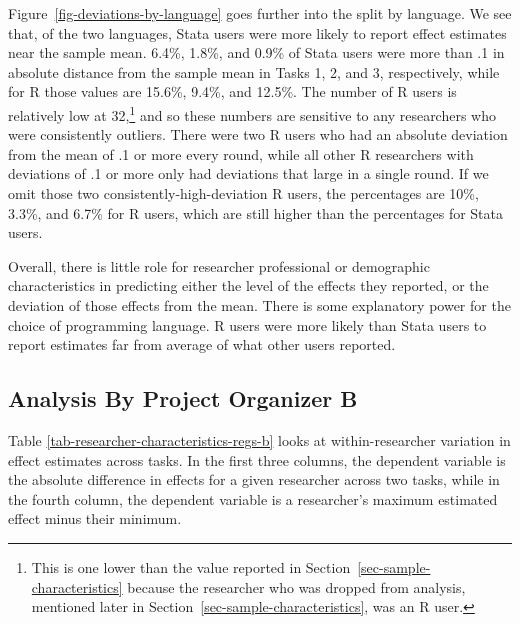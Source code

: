 \documentclass[
  letterpaper,
  DIV=11,
  numbers=noendperiod]{scrartcl}
\begin{document}
Figure~\ref{fig-deviations-by-language} goes further into the split by
language. We see that, of the two languages, Stata users were more
likely to report effect estimates near the sample mean. 6.4\%, 1.8\%,
and 0.9\% of Stata users were more than .1 in absolute distance from the
sample mean in Tasks 1, 2, and 3, respectively, while for R those values
are 15.6\%, 9.4\%, and 12.5\%. The number of R users is relatively low
at 32,\footnote{This is one lower than the value reported in
  Section~\ref{sec-sample-characteristics} because the researcher who
  was dropped from analysis, mentioned later in
  Section~\ref{sec-sample-characteristics}, was an R user.} and so these
numbers are sensitive to any researchers who were consistently outliers.
There were two R users who had an absolute deviation from the mean of .1
or more every round, while all other R researchers with deviations of .1
or more only had deviations that large in a single round. If we omit
those two consistently-high-deviation R users, the percentages are 10\%,
3.3\%, and 6.7\% for R users, which are still higher than the
percentages for Stata users.

Overall, there is little role for researcher professional or demographic
characteristics in predicting either the level of the effects they
reported, or the deviation of those effects from the mean. There is some
explanatory power for the choice of programming language. R users were
more likely than Stata users to report estimates far from average of
what other users reported.

\subsection{Analysis By Project Organizer
B}\label{analysis-by-project-organizer-b}

Table \ref{tab-researcher-characteristics-regs-b} looks at
within-researcher variation in effect estimates across tasks. In the
first three columns, the dependent variable is the absolute difference
in effects for a given researcher across two tasks, while in the fourth
column, the dependent variable is a researcher's maximum estimated
effect minus their minimum.
\end{document}

